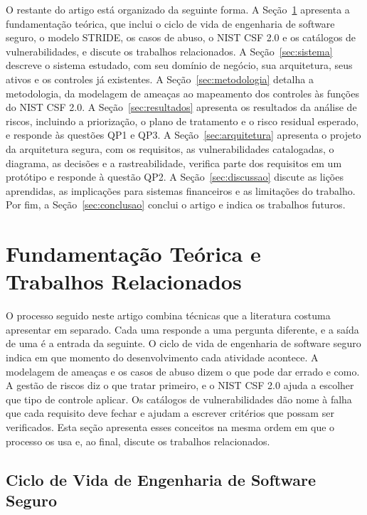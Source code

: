 \documentclass[conference]{IEEEtran}
\begin{document}
O restante do artigo está organizado da seguinte forma. A Seção~\ref{sec:fundamentacao} apresenta a fundamentação teórica, que inclui o ciclo de vida de engenharia de software seguro, o modelo STRIDE, os casos de abuso, o NIST CSF 2.0 e os catálogos de vulnerabilidades, e discute os trabalhos relacionados. A Seção~\ref{sec:sistema} descreve o sistema estudado, com seu domínio de negócio, sua arquitetura, seus ativos e os controles já existentes. A Seção~\ref{sec:metodologia} detalha a metodologia, da modelagem de ameaças ao mapeamento dos controles às funções do NIST CSF 2.0. A Seção~\ref{sec:resultados} apresenta os resultados da análise de riscos, incluindo a priorização, o plano de tratamento e o risco residual esperado, e responde às questões QP1 e QP3. A Seção~\ref{sec:arquitetura} apresenta o projeto da arquitetura segura, com os requisitos, as vulnerabilidades catalogadas, o diagrama, as decisões e a rastreabilidade, verifica parte dos requisitos em um protótipo e responde à questão QP2. A Seção~\ref{sec:discussao} discute as lições aprendidas, as implicações para sistemas financeiros e as limitações do trabalho. Por fim, a Seção~\ref{sec:conclusao} conclui o artigo e indica os trabalhos futuros.

\section{Fundamentação Teórica e Trabalhos Relacionados}
\label{sec:fundamentacao}

O processo seguido neste artigo combina técnicas que a literatura costuma apresentar em separado. Cada uma responde a uma pergunta diferente, e a saída de uma é a entrada da seguinte. O ciclo de vida de engenharia de software seguro indica em que momento do desenvolvimento cada atividade acontece. A modelagem de ameaças e os casos de abuso dizem o que pode dar errado e como. A gestão de riscos diz o que tratar primeiro, e o NIST CSF 2.0 ajuda a escolher que tipo de controle aplicar. Os catálogos de vulnerabilidades dão nome à falha que cada requisito deve fechar e ajudam a escrever critérios que possam ser verificados. Esta seção apresenta esses conceitos na mesma ordem em que o processo os usa e, ao final, discute os trabalhos relacionados.

\subsection{Ciclo de Vida de Engenharia de Software Seguro}
\end{document}
